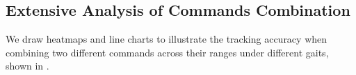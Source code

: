 \subsection{Extensive Analysis of Commands Combination}
\label{ap:heatmaps}
We draw heatmaps and line charts to illustrate the tracking accuracy when combining two different commands across their ranges under different gaits, shown in .


